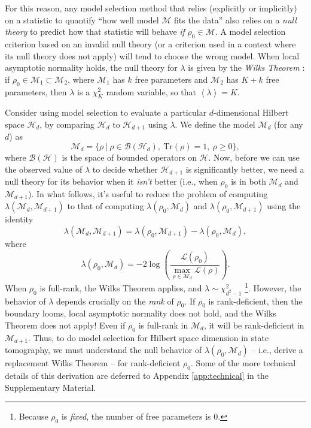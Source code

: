 \documentclass[aps,pra, twocolumn]{revtex4}
\newcommand{\M}{\mathcal{M}}
\newcommand{\cH}{\mathcal{H}}
\newcommand{\expect}[1]{\ensuremath{\left\langle#1\right\rangle}}
\begin{document}
For this reason, any model selection method that relies (explicitly or implicitly) on a statistic to quantify ``how well model $\M$ fits the data'' also relies on a \emph{null theory} to predict how that statistic will behave \emph{if} $\rho_{0} \in \M$.  A model selection criterion based on an invalid null theory (or a criterion used in a context where its null theory does not apply) will tend to choose the wrong model. When local asymptotic normality holds, the null theory for $\lambda$ is given by the \emph{Wilks Theorem} \cite{Wilks1938}: if $\rho_{0}\in \M_{1}\subset \M_{2}$, where $\M_{1}$ has $k$ free parameters and $\M_{2}$ has $K+k$ free parameters, then $ \lambda$ is a $\chi^{2}_{K}$ random variable, so that $\expect{\lambda} = K$.

Consider using model selection to evaluate a particular $d$-dimensional Hilbert space $\cH_{d}$, by comparing $\cH_{d}$ to $\cH_{d+1}$ using $\lambda$. We define the model $\mathcal{M}_{d}$ (for any $d$) as
\begin{equation}
\mathcal{M}_{d} = \{\rho~|~\rho \in \mathcal{B}(\mathcal{H}_{d}),~\mathrm{Tr}(\rho) =1,~\rho \geq 0\},
\end{equation}
where $\mathcal{B}(\cH)$ is the space of bounded operators on $\cH$.
Now, before we can use the observed value of $\lambda$ to decide whether $\mathcal{H}_{d+1}$ is significantly better, we need a null theory for its behavior when it \emph{isn't} better (i.e., when $\rho_{0}$ is in both $\mathcal{M}_d$ and $ \mathcal{M}_{d+1}$). In what follows, it's useful to reduce the problem of computing $\lambda(\M_{d}, \M_{d+1})$ to that of computing $\lambda(\rho_{0}, \M_{d})$ and $\lambda(\rho_{0}, \M_{d+1})$ using the identity
\begin{equation}
\lambda(\mathcal{M}_{d}, \mathcal{M}_{d + 1}) = \lambda(\rho_{0}, \mathcal{M}_{d+1}) - \lambda(\rho_{0}, \mathcal{M}_{d}),
\end{equation}
where
\begin{equation}
\label{eq:llrs}
\lambda(\rho_{0}, \mathcal{M}_{d}) = -2 \log \left(\frac{\mathcal{L}(\rho_{0})}{\underset{\rho \in \mathcal{M}_{d}}{\max}
\mathcal{L}(\rho)}\right).
\end{equation}
When $\rho_{0}$ is full-rank, the Wilks Theorem applies, and  $\lambda \sim \chi^{2}_{d^{2}-1}$ \footnote{Because $\rho_{0}$ is \emph{fixed}, the number of free parameters is 0.}. However, the behavior of $\lambda$ depends crucially on the \emph{rank} of $\rho_{0}$. If $\rho_{0}$ is rank-deficient, then the boundary looms, local asymptotic normality does not hold, and the Wilks Theorem does not apply! Even if $\rho_{0}$ is full-rank in $\M_{d}$, it will be rank-deficient in $\M_{d+1}$. Thus, to do model selection for Hilbert space dimension in state tomography, we must understand the null behavior of $\lambda(\rho_{0}, \M_{d})$ -- i.e., derive a replacement Wilks Theorem -- for rank-deficient $\rho_{0}$.  Some of the more technical details of this derivation are deferred to Appendix \ref{app:technical} in the Supplementary Material.
\end{document}
